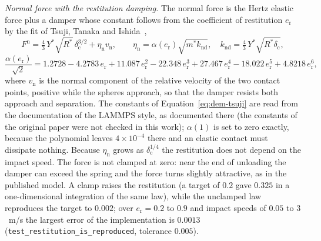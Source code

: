 \emph{Normal force with the restitution damping.} The normal force is the Hertz elastic force plus a damper whose constant follows from the
coefficient of restitution $e_{\mathrm r}$ by the fit of Tsuji, Tanaka and Ishida~\cite{tsuji1992},
\begin{equation}
F^{\mathrm n} = \tfrac43\,Y^{\ast}\sqrt{R^{\ast}}\,\delta_{\mathrm c}^{3/2} + \eta_{\mathrm n} v_{\mathrm n},\qquad
\eta_{\mathrm n}=\alpha(e_{\mathrm r})\sqrt{m^{\ast}k_{\mathrm{nd}}},\quad k_{\mathrm{nd}}=\tfrac43\,Y^{\ast}\sqrt{R^{\ast}\delta_{\mathrm c}},
\label{eq:dem-hertz}
\end{equation}
\begin{equation}
\frac{\alpha(e_{\mathrm r})}{\sqrt2} = 1.2728 - 4.2783\,e_{\mathrm r} + 11.087\,e_{\mathrm r}^2 - 22.348\,e_{\mathrm r}^3 + 27.467\,e_{\mathrm r}^4 - 18.022\,e_{\mathrm r}^5 + 4.8218\,e_{\mathrm r}^6 ,
\label{eq:dem-tsuji}
\end{equation}
where $v_{\mathrm n}$ is the normal component of the relative velocity of the two contact points, positive while the spheres approach, so that the damper
resists both approach and separation. The constants of Equation~\eqref{eq:dem-tsuji} are read from the documentation of the LAMMPS style, as documented there (the constants of the original paper were not checked in this work); $\alpha(1)$ is set to zero exactly, because the polynomial leaves $4\times10^{-4}$ there and an
elastic contact must dissipate nothing. Because $\eta_{\mathrm n}$ grows as $\delta_{\mathrm c}^{1/4}$ the restitution does not depend on the impact speed. The
force is not clamped at zero: near the end of unloading the damper can exceed the spring and the force turns slightly attractive, as in the published
model. A clamp raises the restitution (a target of $0.2$ gave $0.325$ in a one-dimensional integration of the same law), while the unclamped law
reproduces the target to $0.002$; over $e_{\mathrm r}=0.2$ to $0.9$ and impact speeds of $0.05$ to $3$~m/s the largest error of the implementation is $0.0013$
(\texttt{test\_restitution\_is\_reproduced}, tolerance $0.005$).

